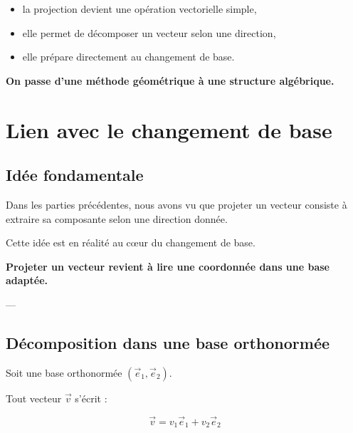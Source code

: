 \documentclass[11pt,a4paper]{article}
\begin{document}
\begin{itemize}
\item la projection devient une opération vectorielle simple,
\item elle permet de décomposer un vecteur selon une direction,
\item elle prépare directement au changement de base.
\end{itemize}

\bigskip

\begin{center}
\textbf{On passe d’une méthode géométrique à une structure algébrique.}
\end{center}

\section{Lien avec le changement de base}

\subsection{Idée fondamentale}

Dans les parties précédentes, nous avons vu que projeter un vecteur consiste à extraire
sa composante selon une direction donnée.

\bigskip

Cette idée est en réalité au cœur du changement de base.

\bigskip

\begin{center}
\Large \textbf{Projeter un vecteur revient à lire une coordonnée dans une base adaptée.}
\end{center}

---

\subsection{Décomposition dans une base orthonormée}

Soit une base orthonormée $(\vec{e}_1,\vec{e}_2)$.

\bigskip

Tout vecteur $\vec{v}$ s’écrit :

\[
\vec{v} = v_1 \vec{e}_1 + v_2 \vec{e}_2
\]
\end{document}

